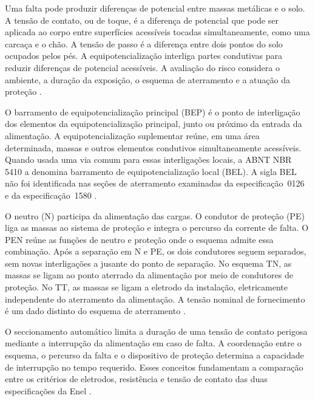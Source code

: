 Uma falta pode produzir diferenças de potencial entre massas metálicas e o solo. A tensão de contato, ou de toque, é a diferença de potencial que pode ser aplicada ao corpo entre superfícies acessíveis tocadas simultaneamente, como uma carcaça e o chão. A tensão de passo é a diferença entre dois pontos do solo ocupados pelos pés. A equipotencialização interliga partes condutivas para reduzir diferenças de potencial acessíveis. A avaliação do risco considera o ambiente, a duração da exposição, o esquema de aterramento e a atuação da proteção \cite[itens~5.1.2.2 e~6.4.2]{abnt5410}\cite[seção~7.24]{enel1580}.

O barramento de equipotencialização principal (BEP) é o ponto de interligação dos elementos da equipotencialização principal, junto ou próximo da entrada da alimentação. A equipotencialização suplementar reúne, em uma área determinada, massas e outros elementos condutivos simultaneamente acessíveis. Quando usada uma via comum para essas interligações locais, a ABNT NBR 5410 a denomina barramento de equipotencialização local (BEL). A sigla BEL não foi identificada nas seções de aterramento examinadas da especificação~0126 e da especificação~1580 \cite[itens~3.3.2--3.3.3 e~6.4.2]{abnt5410}\cite[seção~7.9]{enel0126}\cite[seção~7.24]{enel1580}.

O neutro (N) participa da alimentação das cargas. O condutor de proteção (PE) liga as massas ao sistema de proteção e integra o percurso da corrente de falta. O PEN reúne as funções de neutro e proteção onde o esquema admite essa combinação. Após a separação em N e PE, os dois condutores seguem separados, sem novas interligações a jusante do ponto de separação. No esquema TN, as massas se ligam ao ponto aterrado da alimentação por meio de condutores de proteção. No TT, as massas se ligam a eletrodo da instalação, eletricamente independente do aterramento da alimentação. A tensão nominal de fornecimento é um dado distinto do esquema de aterramento \cite[itens~4.2.2.2 e~6.4.3]{abnt5410}.

O seccionamento automático limita a duração de uma tensão de contato perigosa mediante a interrupção da alimentação em caso de falta. A coordenação entre o esquema, o percurso da falta e o dispositivo de proteção determina a capacidade de interrupção no tempo requerido. Esses conceitos fundamentam a comparação entre os critérios de eletrodos, resistência e tensão de contato das duas especificações da Enel \cite[item~5.1.2.2.4]{abnt5410}\cite[seção~7.9]{enel0126}\cite[seção~7.24]{enel1580}.

